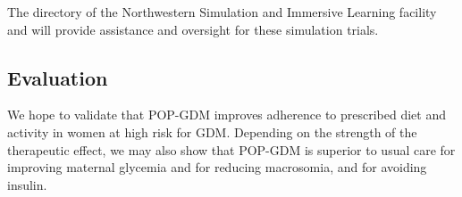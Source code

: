 The directory of the Northwestern Simulation and Immersive Learning
facility and will provide assistance and oversight for these
simulation trials.

\subsection{Evaluation}

We hope to validate that POP-GDM improves adherence to prescribed
diet and activity in women at high risk for GDM. Depending on the
strength of the therapeutic effect, we may also show that POP-GDM is
superior to usual care for improving maternal glycemia and for
reducing macrosomia, and for avoiding insulin. 
